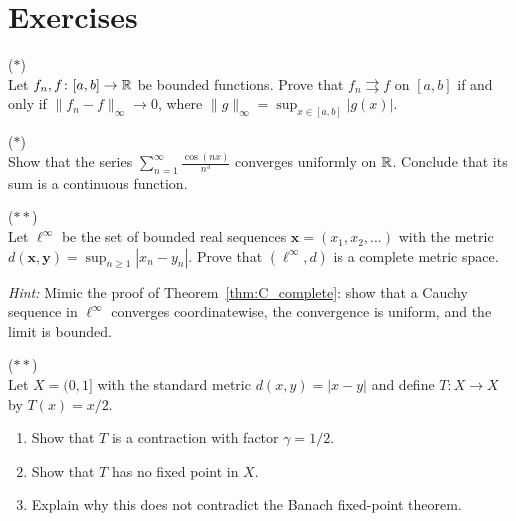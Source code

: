 \documentclass[11pt,a4paper]{article}
\begin{document}
\section{Exercises}
\label{sec:exercises}

\begin{exercise}
\textnormal{(\(*\))} \\
Let $f_n, f \colon [a,b] \to \mathbb{R}$ be bounded functions. Prove that
$f_n \rightrightarrows f$ on $[a,b]$ if and only if
$\|f_n - f\|_\infty \to 0$, where
$\|g\|_\infty = \sup_{x \in [a,b]} |g(x)|$.
\end{exercise}

\begin{exercise}
\textnormal{(\(*\))} \\
Show that the series $\sum_{n=1}^\infty \frac{\cos(nx)}{n^3}$ converges
uniformly on $\mathbb{R}$. Conclude that its sum is a continuous function.
\end{exercise}

\begin{exercise}
\textnormal{(\(**\))} \\
Let $\ell^\infty$ be the set of bounded real sequences
$\mathbf{x} = (x_1, x_2, \ldots)$ with the metric
$d(\mathbf{x}, \mathbf{y}) = \sup_{n \ge 1} |x_n - y_n|$. Prove that
$(\ell^\infty, d)$ is a complete metric space.

\textit{Hint:} Mimic the proof of Theorem~\ref{thm:C_complete}: show
that a Cauchy sequence in $\ell^\infty$ converges coordinatewise, the
convergence is uniform, and the limit is bounded.
\end{exercise}

\begin{exercise}
\textnormal{(\(**\))} \\
Let $X = (0, 1]$ with the standard metric $d(x, y) = |x - y|$ and
define $T \colon X \to X$ by $T(x) = x/2$.
\begin{enumerate}[nosep,label=(\alph*)]
  \item Show that $T$ is a contraction with factor $\gamma = 1/2$.
  \item Show that $T$ has no fixed point in $X$.
  \item Explain why this does not contradict the Banach fixed-point
    theorem.
\end{enumerate}
\end{exercise}
\end{document}
